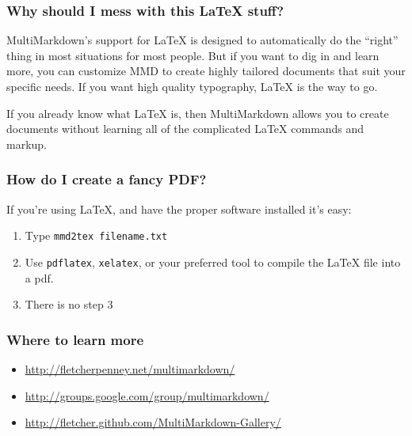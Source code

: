 \begin{frame}

\frametitle{Why should I mess with this LaTeX stuff?}
\label{whyshouldimesswiththislatexstuff}

MultiMarkdown's support for LaTeX is designed to automatically do the ``right''
thing in most situations for most people. But if you want to dig in and learn
more, you can customize MMD to create highly tailored documents that suit your
specific needs. If you want high quality typography, LaTeX is the way to go.

If you already know what LaTeX is, then MultiMarkdown allows you to create
documents without learning all of the complicated LaTeX commands and markup.

\end{frame}

\begin{frame}

\frametitle{How do I create a fancy PDF?}
\label{howdoicreateafancypdf}

If you're using LaTeX, and have the proper software installed it's easy:

\begin{enumerate}
\item Type \texttt{mmd2tex filename.txt}

\item Use \texttt{pdflatex}, \texttt{xelatex}, or your preferred tool to compile the LaTeX
 file into a pdf.

\item There is no step 3

\end{enumerate}

\end{frame}

\begin{frame}

\frametitle{Where to learn more}
\label{wheretolearnmore}

\begin{itemize}
\item \href{http://fletcherpenney.net/multimarkdown/}{http:/\slash fletcherpenney.net\slash multimarkdown\slash }

\item \href{http://groups.google.com/group/multimarkdown/}{http:/\slash groups.google.com\slash group\slash multimarkdown\slash }

\item \href{http://fletcher.github.com/MultiMarkdown-Gallery/}{http:/\slash fletcher.github.com\slash MultiMarkdown-Gallery\slash }

\end{itemize}

\end{frame}

